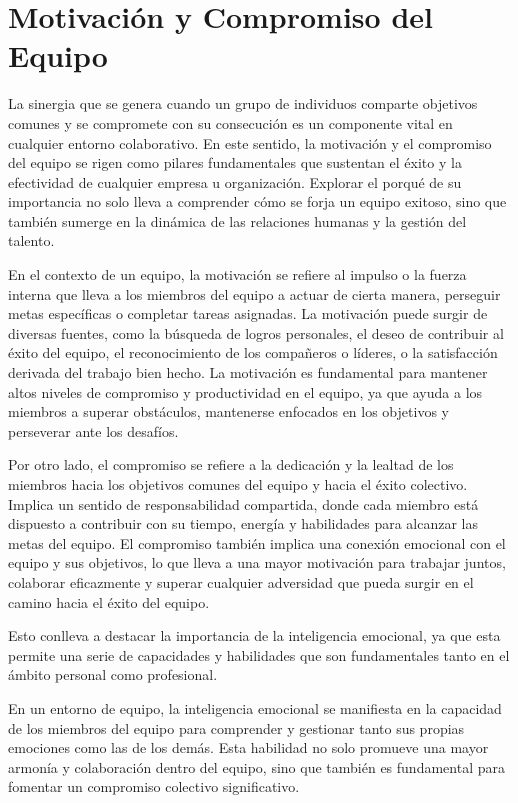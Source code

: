\documentclass[journal]{IEEEtran}
\begin{document}
\section{Motivación y Compromiso del Equipo}
La sinergia que se genera cuando un grupo de individuos comparte objetivos comunes y se compromete con su consecución es un componente vital en cualquier entorno colaborativo. En este sentido, la motivación y el compromiso del equipo se rigen como pilares fundamentales que sustentan el éxito y la efectividad de cualquier empresa u organización. Explorar el porqué de su importancia no solo lleva a comprender cómo se forja un equipo exitoso, sino que también sumerge en la dinámica de las relaciones humanas y la gestión del talento.

En el contexto de un equipo, la motivación se refiere al impulso o la fuerza interna que lleva a los miembros del equipo a actuar de cierta manera, perseguir metas específicas o completar tareas asignadas. La motivación puede surgir de diversas fuentes, como la búsqueda de logros personales, el deseo de contribuir al éxito del equipo, el reconocimiento de los compañeros o líderes, o la satisfacción derivada del trabajo bien hecho. La motivación es fundamental para mantener altos niveles de compromiso y productividad en el equipo, ya que ayuda a los miembros a superar obstáculos, mantenerse enfocados en los objetivos y perseverar ante los desafíos.

Por otro lado, el compromiso se refiere a la dedicación y la lealtad de los miembros hacia los objetivos comunes del equipo y hacia el éxito colectivo. Implica un sentido de responsabilidad compartida, donde cada miembro está dispuesto a contribuir con su tiempo, energía y habilidades para alcanzar las metas del equipo. El compromiso también implica una conexión emocional con el equipo y sus objetivos, lo que lleva a una mayor motivación para trabajar juntos, colaborar eficazmente y superar cualquier adversidad que pueda surgir en el camino hacia el éxito del equipo. 

Esto conlleva a destacar la importancia de la inteligencia emocional, ya que esta permite una serie de capacidades y habilidades que son fundamentales tanto en el ámbito personal como profesional.

En un entorno de equipo, la inteligencia emocional se manifiesta en la capacidad de los miembros del equipo para comprender y gestionar tanto sus propias emociones como las de los demás. Esta habilidad no solo promueve una mayor armonía y colaboración dentro del equipo, sino que también es fundamental para fomentar un compromiso colectivo significativo.
\end{document}
